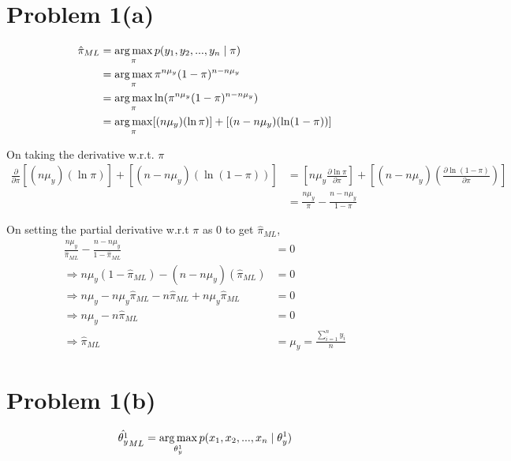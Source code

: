 \documentclass[openany,11pt]{homework}
\begin{document}
\maketitle

\section*{Problem 1(a)}

\begin{align}
\hat{\pi}_{ML} & = \operatornamewithlimits{arg\,max}_{\pi} p(y_1, y_2, ..., y_n \mid \pi) \\
			   & = \operatornamewithlimits{arg\,max}_{\pi} \pi^{n\mu_y}(1-\pi)^{n-n\mu_y} \\
			   & = \operatornamewithlimits{arg\,max}_{\pi} \ln(\pi^{n\mu_y}(1-\pi)^{n-n\mu_y}) \\
			   & = \operatornamewithlimits{arg\,max}_{\pi} [(n\mu_y) (\ln \pi)] + [(n - n\mu_y)(\ln (1-\pi))]
\end{align}

On taking the derivative w.r.t. $\pi$\\
\begin{align}
\frac{\partial }{\partial \pi} [(n\mu_y) (\ln \pi)] + [(n - n\mu_y)(\ln (1-\pi))]
& = \left[n\mu_y \frac{\partial \ln \pi}{\partial \pi}\right] + \left[(n - n\mu_y)\left(\frac{\partial \ln(1-\pi)}{\partial \pi}\right)\right] \\
& = \frac{n\mu_y}{\pi} -\frac{n-n\mu_y}{1-\pi}
\end{align}

On setting the partial derivative w.r.t $\pi$ as 0 to get $\hat{\pi}_{ML}$,
\begin{align}
\frac{n\mu_y}{\hat{\pi}_{ML}} -\frac{n-n\mu_y}{1-\hat{\pi}_{ML}} & = 0 \\
\Rightarrow n\mu_y(1-\hat{\pi}_{ML}) - (n-n\mu_y)(\hat{\pi}_{ML}) & = 0 \\
\Rightarrow n\mu_y - n\mu_y\hat{\pi}_{ML} - n\hat{\pi}_{ML} + n\mu_y\hat{\pi}_{ML} & = 0 \\
\Rightarrow n\mu_y - n\hat{\pi}_{ML} & = 0 \\
\Rightarrow \hat{\pi}_{ML} & = \mu_y = \frac{\sum_{i=1}^{n} y_i}{n}
\end{align}

\section*{Problem 1(b)}

\begin{align}
\hat{\theta_y^{1}}_{ML} & = \operatornamewithlimits{arg\,max}_{\theta_y^{1}} p(x_1, x_2, ..., x_n \mid \theta_y^{1}) \\
\end{align}
\end{document}

